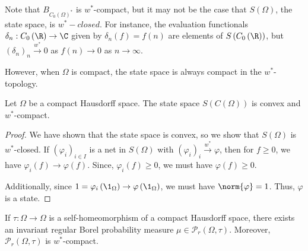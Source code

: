 \documentclass[10pt]{mypackage}
\begin{document}
Note that $B_{C_{0}\left(\Omega\right)^{\ast}}$ is $w^{\ast}$-compact, but it may not be the case that $S\left(\Omega\right)$, the state space, is $w^{\ast}-closed$. For instance, the evaluation functionals $\delta_n: C_0\left(\R\right)\rightarrow \C$ given by $\delta_n\left(f\right) = f(n)$ are elements of $S\left(C_0\left(\R\right)\right)$, but $\left(\delta_n\right)_n\xrightarrow{w^{\ast}} 0$ as $f(n)\rightarrow 0$ as $n\rightarrow\infty$.\newline

However, when $\Omega$ is compact, the state space is always compact in the $w^{\ast}$-topology.
\begin{proposition}
  Let $\Omega$ be a compact Hausdorff space. The state space $S\left(C\left(\Omega\right)\right)$ is convex and $w^{\ast}$-compact.
\end{proposition}
\begin{proof}
  We have shown that the state space is convex, so we show that $S\left(\Omega\right)$ is $w^{\ast}$-closed. If $\left(\varphi_i\right)_{i\in I}$ is a net in $S\left(\Omega\right)$ with $\left(\varphi_i\right)_i\xrightarrow{w^{\ast}}\varphi$, then for $f\geq 0$, we have $\varphi_i\left(f\right)\rightarrow \varphi(f)$. Since, $\varphi_i(f)\geq 0$, we must have $\varphi(f) \geq 0$.\newline

  Additionally, since $1 = \varphi_i\left(\1_{\Omega}\right) \rightarrow \varphi\left(\1_{\Omega}\right)$, we must have $\norm{\varphi} = 1$. Thus, $\varphi$ is a state.
\end{proof}
\begin{corollary}
  If $\tau: \Omega\rightarrow\Omega$ is a self-homeomorphism of a compact Hausdorff space, there exists an invariant regular Borel probability measure $\mu\in \mathcal{P}_{r}\left(\Omega,\tau\right)$. Moreover, $\mathcal{P}_{r}\left(\Omega,\tau\right)$ is $w^{\ast}$-compact.
\end{corollary}
\end{document}
